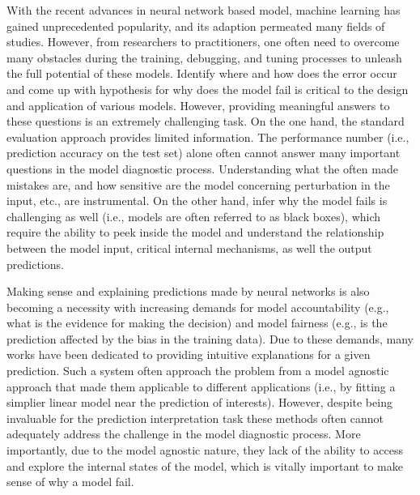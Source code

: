 \maketitle

With the recent advances in neural network based model, machine learning has
gained unprecedented popularity, and its adaption permeated many fields of studies.
%
However, from researchers to practitioners, one often need to overcome many
obstacles during the training, debugging, and tuning processes to unleash
the full potential of these models.
%
Identify where and how does the error occur and come up with hypothesis for
why does the model fail is critical to the design and application of various models.
However, providing meaningful answers to these questions is an extremely challenging task.
On the one hand, the standard evaluation approach provides limited information. The performance number (i.e., prediction accuracy on the test set) alone often cannot answer many important questions in the model diagnostic process. Understanding what the often made mistakes are, and how sensitive are the model concerning perturbation in the input, etc., are instrumental. On the other hand, infer why the model fails is challenging as well (i.e., models are often referred to as black boxes),
which require the ability to peek inside the model and understand the relationship between the
model input, critical internal mechanisms, as well the output predictions.

Making sense and explaining predictions made by neural networks is also becoming a necessity with increasing demands for model accountability (e.g., what is the evidence for making the decision) and model fairness (e.g., is the prediction affected by the bias in the training data).
%
Due to these demands, many works have been dedicated to providing intuitive explanations for a given prediction. Such a system often approach the problem from a model agnostic approach that made them applicable to different applications (i.e., by fitting a simplier linear model near the prediction of interests).
%
However, despite being invaluable for the prediction interpretation task these methods often cannot adequately address the challenge in the model diagnostic process. More importantly, due to the model agnostic nature, they lack of the ability to access and explore the internal states of the model, which is vitally important to make sense of why a model fail.

